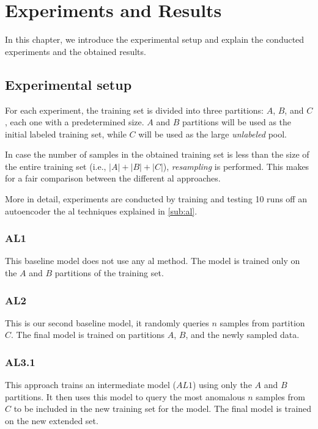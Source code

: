 \chapter{Experiments and Results}
    \label{chap:experiments}
    
    In this chapter, we introduce the experimental setup and explain the conducted experiments and the obtained results.
    
    \section{Experimental setup}
        For each experiment, the training set is divided into three partitions: $A$, $B$, and $C$, each one with a predetermined size. $A$ and $B$ partitions will be used as the initial labeled training set, while $C$ will be used as the large \emph{unlabeled} pool.
        
        
        In case the number of samples in the obtained training set is less than the size of the entire training set (i.e., $|A| + |B| + |C|$), \emph{resampling} is performed. This makes for a fair comparison between the different \acrshort{al} approaches.
        
        
        More in detail, experiments are conducted by training and testing 10 runs off an autoencoder the \acrshort{al} techniques explained in \autoref{sub:al}.
             \subsection*{AL1}
             This baseline model does not use any \acrshort{al} method. The model is trained only on the $A$ and $B$ partitions of the training set.
             
             \subsection*{AL2}
             This is our second baseline model, it randomly queries $n$ samples from partition $C$. The final model is trained on partitions $A$, $B$, and the newly sampled data.
             
             \subsection*{AL3.1}
             This approach trains an intermediate model ($AL1$) using only the $A$ and $B$ partitions. It then uses this model to query the most anomalous $n$ samples from $C$ to be included in the new training set for the model. The final model is trained on the new extended set.
             

